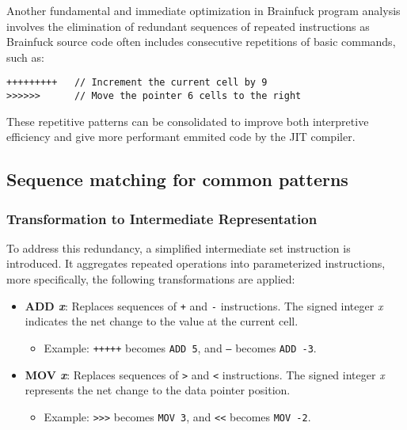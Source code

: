 \par Another fundamental and immediate optimization in Brainfuck program analysis involves the elimination of redundant sequences of repeated instructions as Brainfuck source code often includes consecutive repetitions of basic commands, such as:

\begin{verbatim}
+++++++++   // Increment the current cell by 9
>>>>>>      // Move the pointer 6 cells to the right
\end{verbatim}

\par These repetitive patterns can be consolidated to improve both interpretive efficiency and give more performant emmited code by the JIT compiler.

\subsection{Sequence matching for common patterns}
\label{subsec:ch2sec3sec3}

\subsubsection*{Transformation to Intermediate Representation}

To address this redundancy, a simplified intermediate set instruction is introduced. It aggregates repeated operations into parameterized instructions, more specifically, the following transformations are applied:

\begin{itemize}
    \item \textbf{ADD \textit{x}}: Replaces sequences of \texttt{+} and \texttt{-} instructions. The signed integer \textit{x} indicates the net change to the value at the current cell.
    \begin{itemize}
        \item Example: \texttt{+++++} becomes \texttt{ADD 5}, and \texttt{---} becomes \texttt{ADD -3}.
    \end{itemize}

    \item \textbf{MOV \textit{x}}: Replaces sequences of \texttt{>} and \texttt{<} instructions. The signed integer \textit{x} represents the net change to the data pointer position.
    \begin{itemize}
        \item Example: \texttt{>>>} becomes \texttt{MOV 3}, and \texttt{<<} becomes \texttt{MOV -2}.
    \end{itemize}
\end{itemize}

